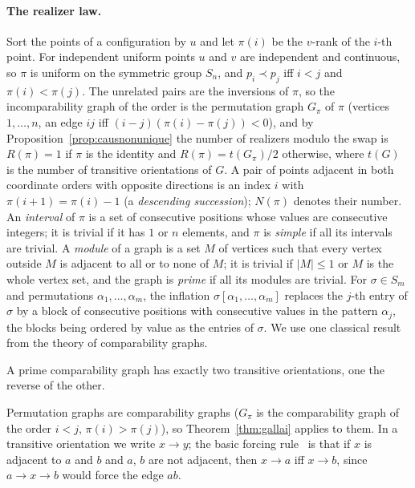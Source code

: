 \paragraph{The realizer law.}
Sort the points of a configuration by $u$ and let $\pi(i)$ be the $v$-rank of the $i$-th point. For independent uniform points $u$ and $v$ are independent and continuous, so $\pi$ is uniform on the symmetric group $S_n$, and $p_i\prec p_j$ iff $i<j$ and $\pi(i)<\pi(j)$. The unrelated pairs are the inversions of $\pi$, so the incomparability graph of the order is the permutation graph $G_\pi$ of $\pi$ (vertices $1,\dots,n$, an edge $ij$ iff $(i-j)(\pi(i)-\pi(j))<0$), and by Proposition~\ref{prop:causnonunique} the number of realizers modulo the swap is $R(\pi)=1$ if $\pi$ is the identity and $R(\pi)=t(G_\pi)/2$ otherwise, where $t(G)$ is the number of transitive orientations of $G$. A pair of points adjacent in both coordinate orders with opposite directions is an index $i$ with $\pi(i+1)=\pi(i)-1$ (a \emph{descending succession}); $N(\pi)$ denotes their number. An \emph{interval} of $\pi$ is a set of consecutive positions whose values are consecutive integers; it is trivial if it has $1$ or $n$ elements, and $\pi$ is \emph{simple} if all its intervals are trivial. A \emph{module} of a graph is a set $M$ of vertices such that every vertex outside $M$ is adjacent to all or to none of $M$; it is trivial if $|M|\le1$ or $M$ is the whole vertex set, and the graph is \emph{prime} if all its modules are trivial. For $\sigma\in S_m$ and permutations $\alpha_1,\dots,\alpha_m$, the inflation $\sigma[\alpha_1,\dots,\alpha_m]$ replaces the $j$-th entry of $\sigma$ by a block of consecutive positions with consecutive values in the pattern $\alpha_j$, the blocks being ordered by value as the entries of $\sigma$. We use one classical result from the theory of comparability graphs.

\begin{theorem}\label{thm:gallai}
A prime comparability graph has exactly two transitive orientations, one the reverse of the other.
\end{theorem}

\noindent Permutation graphs are comparability graphs ($G_\pi$ is the comparability graph of the order $i<j$, $\pi(i)>\pi(j)$), so Theorem~\ref{thm:gallai} applies to them. In a transitive orientation we write $x\to y$; the basic forcing rule~\citep{gallai1967,golumbic1980} is that if $x$ is adjacent to $a$ and $b$ and $a$, $b$ are not adjacent, then $x\to a$ iff $x\to b$, since $a\to x\to b$ would force the edge $ab$.

